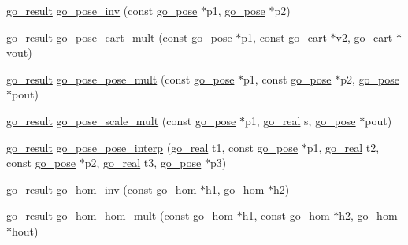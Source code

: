 \begin{DoxyCompactItemize}
\hyperlink{gotypes_8h_a55d48b38cd959f63c7e8db8337a9792a}{go\-\_\-result} \hyperlink{namespacegomotion_a7659bf73ec87a38607995939ca405cc5}{go\-\_\-pose\-\_\-inv} (const \hyperlink{structgomotion_1_1go__pose}{go\-\_\-pose} $\ast$p1, \hyperlink{structgomotion_1_1go__pose}{go\-\_\-pose} $\ast$p2)
\item 
\hyperlink{gotypes_8h_a55d48b38cd959f63c7e8db8337a9792a}{go\-\_\-result} \hyperlink{namespacegomotion_a8fddcbebee69b64a2536721c33087e3c}{go\-\_\-pose\-\_\-cart\-\_\-mult} (const \hyperlink{structgomotion_1_1go__pose}{go\-\_\-pose} $\ast$p1, const \hyperlink{structgomotion_1_1go__cart}{go\-\_\-cart} $\ast$v2, \hyperlink{structgomotion_1_1go__cart}{go\-\_\-cart} $\ast$vout)
\item 
\hyperlink{gotypes_8h_a55d48b38cd959f63c7e8db8337a9792a}{go\-\_\-result} \hyperlink{namespacegomotion_a67d9fb285388234b9ea790849952b965}{go\-\_\-pose\-\_\-pose\-\_\-mult} (const \hyperlink{structgomotion_1_1go__pose}{go\-\_\-pose} $\ast$p1, const \hyperlink{structgomotion_1_1go__pose}{go\-\_\-pose} $\ast$p2, \hyperlink{structgomotion_1_1go__pose}{go\-\_\-pose} $\ast$pout)
\item 
\hyperlink{gotypes_8h_a55d48b38cd959f63c7e8db8337a9792a}{go\-\_\-result} \hyperlink{namespacegomotion_a1cca8106f4bb9eb3822b5fb356164c3e}{go\-\_\-pose\-\_\-scale\-\_\-mult} (const \hyperlink{structgomotion_1_1go__pose}{go\-\_\-pose} $\ast$p1, \hyperlink{gotypes_8h_afd666a2393eebd71ee455846ac9def9b}{go\-\_\-real} s, \hyperlink{structgomotion_1_1go__pose}{go\-\_\-pose} $\ast$pout)
\item 
\hyperlink{gotypes_8h_a55d48b38cd959f63c7e8db8337a9792a}{go\-\_\-result} \hyperlink{namespacegomotion_a4662e2daf4c61f269935131eefda1d2a}{go\-\_\-pose\-\_\-pose\-\_\-interp} (\hyperlink{gotypes_8h_afd666a2393eebd71ee455846ac9def9b}{go\-\_\-real} t1, const \hyperlink{structgomotion_1_1go__pose}{go\-\_\-pose} $\ast$p1, \hyperlink{gotypes_8h_afd666a2393eebd71ee455846ac9def9b}{go\-\_\-real} t2, const \hyperlink{structgomotion_1_1go__pose}{go\-\_\-pose} $\ast$p2, \hyperlink{gotypes_8h_afd666a2393eebd71ee455846ac9def9b}{go\-\_\-real} t3, \hyperlink{structgomotion_1_1go__pose}{go\-\_\-pose} $\ast$p3)
\item 
\hyperlink{gotypes_8h_a55d48b38cd959f63c7e8db8337a9792a}{go\-\_\-result} \hyperlink{namespacegomotion_aafe2ece40a4ac948cd8d07c069ef0434}{go\-\_\-hom\-\_\-inv} (const \hyperlink{structgomotion_1_1go__hom}{go\-\_\-hom} $\ast$h1, \hyperlink{structgomotion_1_1go__hom}{go\-\_\-hom} $\ast$h2)
\item 
\hyperlink{gotypes_8h_a55d48b38cd959f63c7e8db8337a9792a}{go\-\_\-result} \hyperlink{namespacegomotion_a7b65e9509700ef5c058f152c21b5643c}{go\-\_\-hom\-\_\-hom\-\_\-mult} (const \hyperlink{structgomotion_1_1go__hom}{go\-\_\-hom} $\ast$h1, const \hyperlink{structgomotion_1_1go__hom}{go\-\_\-hom} $\ast$h2, \hyperlink{structgomotion_1_1go__hom}{go\-\_\-hom} $\ast$hout)

\end{DoxyCompactItemize}
